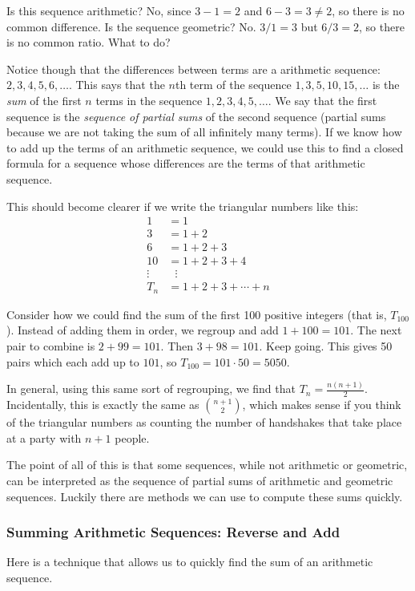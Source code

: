 \documentclass[12pt]{article}
\begin{document}
Is this sequence arithmetic?  No, since $3-1 = 2$ and $6-3 = 3 \ne 2$, so there is no common difference.  Is the sequence geometric?  No.  $3/1 = 3$ but $6/3 = 2$, so there is no common ratio.  What to do?  

Notice though that the differences between terms are a arithmetic sequence: $2, 3, 4, 5, 6,\ldots$.  This says that the $n$th term of the sequence $1,3,5,10,15,\ldots$ is the {\em sum} of the first $n$ terms in the sequence $1,2,3,4,5,\ldots$.  We say that the first sequence is the {\em sequence of partial sums} of the second sequence (partial sums because we are not taking the sum of all infinitely many terms). If we know how to add up the terms of an arithmetic sequence, we could use this to find a closed formula for a sequence whose differences are the terms of that arithmetic sequence. 

This should become clearer if we write the triangular numbers like this:
\begin{align*}
1 &= 1\\
3 &= 1+2\\
6 &= 1 + 2 + 3\\
10 &= 1+2 + 3+ 4\\
\vdots & ~~~\vdots \\
T_n &= 1 + 2 + 3 + \cdots + n
\end{align*}

Consider how we could find the sum of the first 100 positive integers (that is, $T_{100}$).  Instead of adding them in order, we regroup and add $1+100 = 101$.  The next pair to combine is $2+99 = 101$.  Then $3+98 = 101$.  Keep going.  This gives 50 pairs which each add up to $101$, so $T_{100} = 101\cdot 50 = 5050$.

In general, using this same sort of regrouping, we find that $T_n = \frac{n(n+1)}{2}$.  Incidentally, this is exactly the same as ${n+1 \choose 2}$, which makes sense if you think of the triangular numbers as counting the number of handshakes that take place at a party with $n+1$ people.

The point of all of this is that some sequences, while not arithmetic or geometric, can be interpreted as the sequence of partial sums of arithmetic and geometric sequences.  Luckily there are methods we can use to compute these sums quickly.

\subsubsection*{Summing Arithmetic Sequences: Reverse and Add}
Here is a technique that allows us to quickly find the sum of an arithmetic sequence. 
\end{document}
